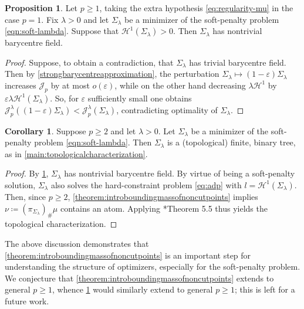 \documentclass[preprint, reqno]{amsart}
\theoremstyle{definition}
\newtheorem{corollary}[definition]{Corollary}
\newtheorem{proposition}[definition]{Proposition}
\numberwithin{equation}{section}
\begin{document}
\begin{proposition} \label{thm:soft-penalty-nontrivial-bary} Let $p
  \geq 1$, taking the extra hypothesis \eqref{eq:regularity-mu} in the
  case $p=1$. Fix $\lambda > 0$ and let $\Sigma_\lambda$ be a
  minimizer of the soft-penalty problem \eqref{eqn:soft-lambda}.
  Suppose that $\mathcal H^1(\Sigma_\lambda) > 0$. Then
  $\Sigma_\lambda$ has nontrivial barycentre field.
\end{proposition}
\begin{proof}
  Suppose, to obtain a contradiction, that $\Sigma_\lambda$ has
  trivial barycentre field. Then by
  \cref{strongbarycentreapproximation}, the perturbation
  $\Sigma_\lambda \mapsto (1-\varepsilon) \Sigma_\lambda$ increases
  $\mathscr J_p$ by at most $o(\varepsilon)$, while on the other hand
  decreasing $\lambda \mathcal H^1$ by $\varepsilon \lambda \mathcal
  H^1(\Sigma_\lambda)$. So, for $\varepsilon$ sufficiently small one
  obtains $\mathscr J_p^\lambda((1-\varepsilon) \Sigma_\lambda) <
  \mathscr J_p^\lambda(\Sigma_\lambda)$, contradicting optimality of
  $\Sigma_\lambda$.
\end{proof}
\begin{corollary} \label{cor:soft-penalty-top-char} Suppose $p \geq 2$
  and let $\lambda > 0$. Let $\Sigma_\lambda$ be a minimizer of the
  soft-penalty problem \eqref{eqn:soft-lambda}. Then $\Sigma_\lambda$
  is a (topological) finite, binary tree, as in
  \cref{main:topologicalcharacterization}.
\end{corollary}
\begin{proof}
  By \cref{thm:soft-penalty-nontrivial-bary}, $\Sigma_\lambda$ has
  nontrivial barycentre field. By virtue of being a soft-penalty
  solution, $\Sigma_\lambda$ also solves the hard-constraint problem
  \eqref{eq:adp} with $l = \mathcal H^1(\Sigma_\lambda)$. Then, since
  $p \geq 2$, \cref{theorem:introboundingmassofnoncutpoints} implies
  $\nu \coloneqq (\pi_{\Sigma_\lambda})_{\#}\mu$ contains an atom.
  Applying \cite{Stepanov06}*{Theorem 5.5} thus yields the topological
  characterization.
\end{proof}

The above discussion demonstrates that
\cref{theorem:introboundingmassofnoncutpoints} is an important step
for understanding the structure of optimizers, especially for the
soft-penalty problem. We conjecture that
\cref{theorem:introboundingmassofnoncutpoints} extends to general $p
\geq 1$, whence \cref{cor:soft-penalty-top-char} would similarly
extend to general $p \geq 1$; this is left for a future work.
\end{document}
